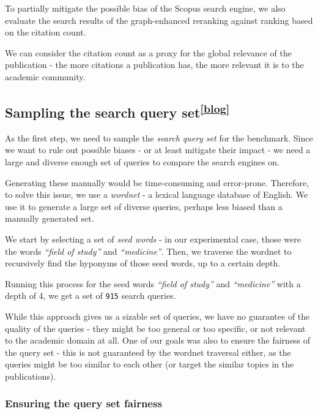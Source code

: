 To partially mitigate the possible bias of the Scopus search engine, 
we also evaluate the search results of the graph-enhanced reranking against 
ranking based on the citation count. 

We can consider the citation count as a proxy for the global relevance of the publication - the more citations a publication has, the more relevant it is to the academic community.

\subsection[Sampling the search query set]{Sampling the search query set\textsuperscript{\href{https://jindrich.bar/edu/thesis-blog/ranking-benchmarks/}{[blog]}}}

As the first step, we need to sample the \textit{search query set} for the benchmark. 
Since we want to rule out possible biases - or at least mitigate their impact - we need a large and diverse enough set of queries to compare the search engines on.

Generating these manually would be time-consuming and error-prone. 
Therefore, to solve this issue, we use a \textit{wordnet} - a lexical language database of English.
We use it to generate a large set of diverse queries, perhaps less biased than a manually generated set.

We start by selecting a set of \textit{seed words} - in our experimental case, those were the words \textit{``field of study''} and \textit{``medicine''}.
Then, we traverse the wordnet to recursively find the hyponyms of those seed words, up to a certain depth.

Running this process for the seed words \textit{``field of study''} and \textit{``medicine''} with a depth of 4, we get a set of \texttt{915} search queries.

While this approach gives us a sizable set of queries, we have no guarantee of the quality of the queries - they might be too general or too specific, or not relevant to the academic domain at all.
One of our goals was also to ensure the fairness of the query set - this is not guaranteed by the wordnet traversal either, as the queries might be too similar to each other (or target the similar topics in the publications).

\subsubsection{Ensuring the query set fairness}

